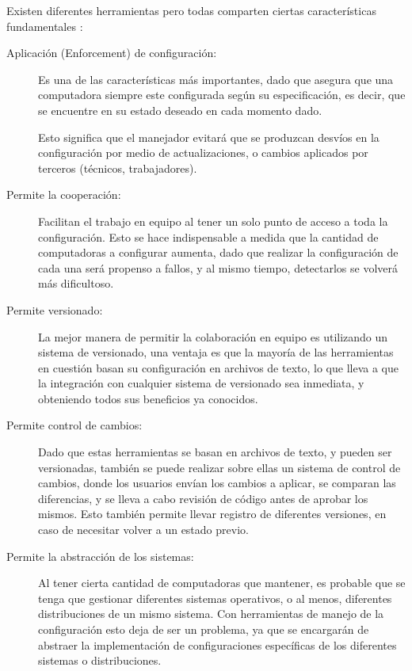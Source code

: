 Existen diferentes herramientas pero todas comparten ciertas características fundamentales \cite{cotton2016what}:

\begin{description}
\item[Aplicación (Enforcement) de configuración:] Es una de las características más importantes, dado que asegura que una computadora siempre este configurada según su especificación, es decir, que se encuentre en su estado deseado en cada momento dado.

Esto significa que el manejador evitará que se produzcan desvíos en la configuración por medio de actualizaciones, o cambios aplicados por terceros (técnicos, trabajadores).

\item[Permite la cooperación:] Facilitan el trabajo en equipo al tener un solo punto de acceso a toda la configuración. 
Esto se hace indispensable a medida que la cantidad de computadoras a configurar aumenta, dado que realizar la configuración de cada una será propenso a fallos, y al mismo tiempo, detectarlos se volverá más dificultoso.

\item[Permite versionado:] La mejor manera de permitir la colaboración en equipo es utilizando un sistema de versionado, una ventaja es que la mayoría de las herramientas en cuestión basan su configuración en archivos de texto, lo que lleva a que la integración con cualquier sistema de versionado sea inmediata, y obteniendo todos sus beneficios ya conocidos.

\item[Permite control de cambios:] Dado que estas herramientas se basan en archivos de texto, y pueden ser versionadas, también se puede realizar sobre ellas un sistema de control de cambios, donde los usuarios envían los cambios a aplicar, se comparan las diferencias, y se lleva a cabo revisión de código antes de aprobar los mismos.
Esto también permite llevar registro de diferentes versiones, en caso de necesitar volver a un estado previo.

\item[Permite la abstracción de los sistemas:] Al tener cierta cantidad de computadoras que mantener, es probable que se tenga que gestionar diferentes sistemas operativos, o al menos, diferentes distribuciones de un mismo sistema. Con herramientas de manejo de la configuración esto deja de ser un problema, ya que se encargarán de abstraer la implementación de configuraciones específicas de los diferentes sistemas o distribuciones.

\end{description}

